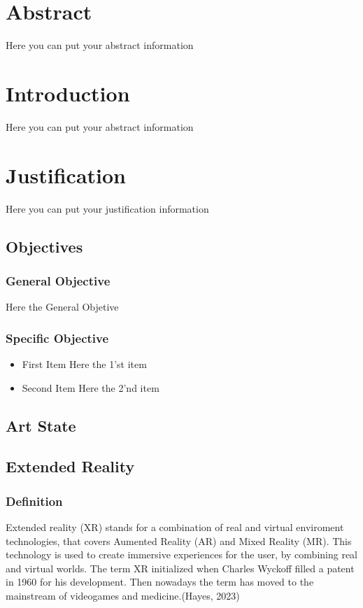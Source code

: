 \documentclass[twoside]{article}
\begin{document}

\tableofcontents
\clearpage

\tableofcontents

\section{Abstract}
Here you can put your abstract information 

\clearpage

\section{Introduction}
Here you can put your abstract information

\clearpage

\section{Justification}
Here you can put your justification information

\clearpage

\subsection{Objectives}
    \subsubsection{General Objective}
    Here the General Objetive
    \subsubsection{Specific Objective}
    \begin{itemize}
        \item{First Item}
            Here the 1'st item 
        \item{Second Item}
            Here the 2'nd item
    \end{itemize}
\clearpage
\subsection{Art State}
\subsection{Extended Reality}
\subsubsection{Definition}
Extended reality (XR) stands for a combination of real and virtual enviroment technologies, that covers Aumented Reality (AR) and Mixed Reality (MR). This technology is used to create immersive experiences for the user, by combining real and virtual worlds. The term XR initialized when Charles Wyckoff filled a patent in 1960 for his development. Then nowadays the term has moved to the mainstream of videogames and medicine.(Hayes, 2023)
\end{document}
